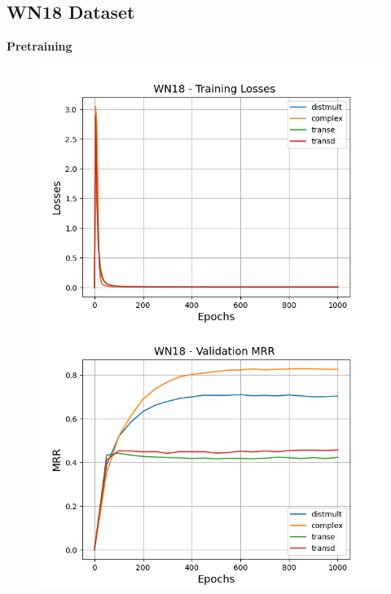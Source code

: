 \subsection{WN18 Dataset}

\textbf{Pretraining}\\

\begin{figure}
    \centering
    \begin{minipage}{.3\textwidth}
      \centering
      \includegraphics[width=0.9\linewidth]{figures/results/pretrain/wn18/pretrain_wn18_losses.png}
    \end{minipage}%
    \begin{minipage}{.3\textwidth}
      \centering
      \includegraphics[width=0.9\linewidth]{figures/results/pretrain/wn18/pretrain_wn18_mrrs.png}
    \end{minipage}
    \begin{minipage}{.3\textwidth}

\end{minipage}
\end{figure}
